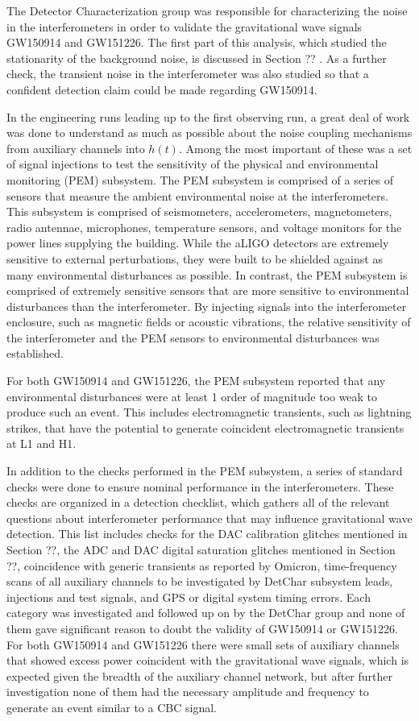 The Detector Characterization group was responsible for characterizing the 
noise in the interferometers in order to validate the gravitational 
wave signals GW150914 and GW151226. The first part of this analysis, which studied the 
stationarity of the background noise, is discussed in Section ?? . As a further 
check, the transient noise in the interferometer was also studied so that a 
confident detection claim could be made regarding GW150914. 

In the engineering runs leading up to the first observing run, a great deal of 
work was done to understand as much as possible about the noise coupling mechanisms 
from auxiliary channels into $h(t)$. Among the most important of these was a set 
of signal injections to test the sensitivity of the physical and environmental 
monitoring (PEM) subsystem. The PEM subsystem is comprised of a series of sensors 
that measure the ambient environmental noise at the interferometers. This 
subsystem is comprised of seismometers, accelerometers, magnetometers, radio 
antennae, microphones, temperature sensors, and voltage monitors for the power 
lines supplying the building. While the aLIGO detectors are extremely sensitive 
to external perturbations, they were built to be shielded against as many 
environmental disturbances as possible. In contrast, the PEM subsystem is comprised 
of extremely sensitive sensors that are more sensitive to environmental disturbances 
than the interferometer. By injecting signals into the interferometer enclosure, 
such as magnetic fields or acoustic vibrations, the relative sensitivity of the 
interferometer and the PEM sensors to environmental disturbances was established.

For both GW150914 and GW151226, the PEM subsystem reported that any environmental 
disturbances were at least 1 order of magnitude too weak to produce such an event. 
This includes electromagnetic transients, such as lightning strikes, that have the 
potential to generate coincident electromagnetic transients at L1 and H1. 

In addition to the checks performed in the PEM subsystem, a series of standard 
checks were done to ensure nominal performance in the interferometers. These 
checks are organized in a detection checklist, which gathers all of the 
relevant questions about interferometer performance that may influence 
gravitational wave detection. This list includes checks 
for the DAC calibration glitches mentioned in Section ??, the ADC and DAC 
digital saturation glitches mentioned in Section ??, coincidence with 
generic transients 
as reported by Omicron, time-frequency scans of all auxiliary channels to be 
investigated by DetChar subsystem leads, injections and test signals, and 
GPS or digital system timing errors. Each category was investigated and 
followed up on by the DetChar group and none of them gave significant 
reason to doubt the validity of GW150914 or GW151226.  
For both GW150914 and GW151226 there were small sets of auxiliary channels 
that showed excess power coincident with the 
gravitational wave signals, which is expected given the breadth of the auxiliary 
channel network, but after further investigation none of them had the 
necessary amplitude and frequency to generate an event similar to a CBC 
signal. 
